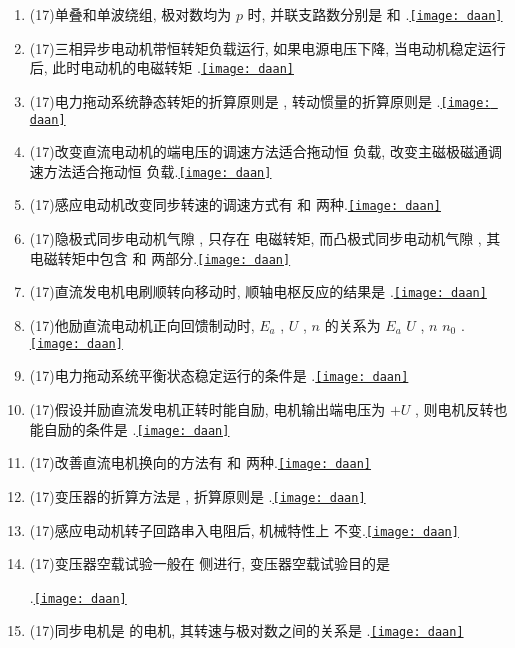 \documentclass[lang=cn,11pt,marginpar=margintrue]{elegantbook}%
\newcommand{\daan}[1]{\hfill\hyperref[#1]{\texttt{[image: daan]}}}
\newcommand{\xiahua}[1]{ \underline{\hspace{#1 pc}} }
\begin{document}
\begin{enumerate}
	\item (17)单叠和单波绕组, 极对数均为 $p$ 时, 并联支路数分别是\xiahua{2}和\xiahua{2}.\daan{tk:49}
	\item (17)三相异步电动机带恒转矩负载运行,  如果电源电压下降,  当电动机稳定运行后, 此时电动机的电磁转矩\xiahua{4}.\daan{tk:50}
	\item (17)电力拖动系统静态转矩的折算原则是\xiahua{8}, 转动惯量的折算原则是\xiahua{8}.\daan{tk:51}
	\item (17)改变直流电动机的端电压的调速方法适合拖动恒\xiahua{2}负载, 改变主磁极磁通调速方法适合拖动恒\xiahua{2}负载.\daan{tk:52}
	\item (17)感应电动机改变同步转速的调速方式有\xiahua{2}和\xiahua{2}两种.\daan{tk:53}
	\item (17)隐极式同步电动机气隙\xiahua{2}, 只存在\xiahua{2}电磁转矩, 而凸极式同步电动机气隙\xiahua{3}, 其电磁转矩中包含\xiahua{6}和\xiahua{6}两部分.\daan{tk:54}
	\item (17)直流发电机电刷顺转向移动时, 顺轴电枢反应的结果是\xiahua{2}.\daan{tk:55}
	\item (17)他励直流电动机正向回馈制动时, $E_a$ , $U$ , $n$ 的关系为 $E_a$ \xiahua{1} $U$ , $n$ \xiahua{1} $n_0$ .\daan{tk:56}
	\item (17)电力拖动系统平衡状态稳定运行的条件是\xiahua{4}.\daan{tk:57}
	\item (17)假设并励直流发电机正转时能自励, 电机输出端电压为 $+U$ , 则电机反转也能自励的条件是\xiahua{10}.\daan{tk:58}
	\item (17)改善直流电机换向的方法有\xiahua{4}和\xiahua{4}两种.\daan{tk:59}
	\item (17)变压器的折算方法是\xiahua{20}, 折算原则是\xiahua{8}.\daan{tk:60}
	\item (17)感应电动机转子回路串入电阻后, 机械特性上\xiahua{2}不变.\daan{tk:61}
	\item (17)变压器空载试验一般在\xiahua{2}侧进行, 变压器空载试验目的是\xiahua{6}
	
	\xiahua{30}.\daan{tk:62}
	\item (17)同步电机是\xiahua{20}的电机, 其转速与极对数之间的关系是\xiahua{4}.\daan{tk:63}
\end{enumerate}
\end{document}

